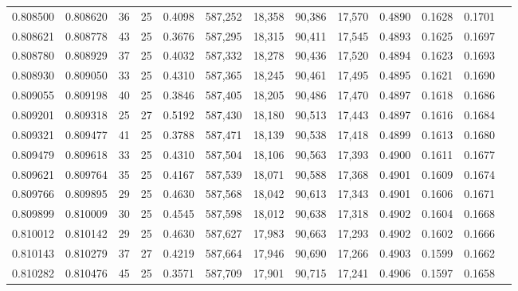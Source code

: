 \begin{tabular}{rrrrrrrrrrrrr}
0.808500 & 0.808620 &    36 &  25 &                                     0.4098 & 587,252 &  18,358 &  90,386 &  17,570 & 0.4890 & 0.1628 & 0.1701 \\
0.808621 & 0.808778 &    43 &  25 &                                     0.3676 & 587,295 &  18,315 &  90,411 &  17,545 & 0.4893 & 0.1625 & 0.1697 \\
0.808780 & 0.808929 &    37 &  25 &                                     0.4032 & 587,332 &  18,278 &  90,436 &  17,520 & 0.4894 & 0.1623 & 0.1693 \\
0.808930 & 0.809050 &    33 &  25 &                                     0.4310 & 587,365 &  18,245 &  90,461 &  17,495 & 0.4895 & 0.1621 & 0.1690 \\
0.809055 & 0.809198 &    40 &  25 &                                     0.3846 & 587,405 &  18,205 &  90,486 &  17,470 & 0.4897 & 0.1618 & 0.1686 \\
0.809201 & 0.809318 &    25 &  27 &                                     0.5192 & 587,430 &  18,180 &  90,513 &  17,443 & 0.4897 & 0.1616 & 0.1684 \\
0.809321 & 0.809477 &    41 &  25 &                                     0.3788 & 587,471 &  18,139 &  90,538 &  17,418 & 0.4899 & 0.1613 & 0.1680 \\
0.809479 & 0.809618 &    33 &  25 &                                     0.4310 & 587,504 &  18,106 &  90,563 &  17,393 & 0.4900 & 0.1611 & 0.1677 \\
0.809621 & 0.809764 &    35 &  25 &                                     0.4167 & 587,539 &  18,071 &  90,588 &  17,368 & 0.4901 & 0.1609 & 0.1674 \\
0.809766 & 0.809895 &    29 &  25 &                                     0.4630 & 587,568 &  18,042 &  90,613 &  17,343 & 0.4901 & 0.1606 & 0.1671 \\
0.809899 & 0.810009 &    30 &  25 &                                     0.4545 & 587,598 &  18,012 &  90,638 &  17,318 & 0.4902 & 0.1604 & 0.1668 \\
0.810012 & 0.810142 &    29 &  25 &                                     0.4630 & 587,627 &  17,983 &  90,663 &  17,293 & 0.4902 & 0.1602 & 0.1666 \\
0.810143 & 0.810279 &    37 &  27 &                                     0.4219 & 587,664 &  17,946 &  90,690 &  17,266 & 0.4903 & 0.1599 & 0.1662 \\
0.810282 & 0.810476 &    45 &  25 &                                     0.3571 & 587,709 &  17,901 &  90,715 &  17,241 & 0.4906 & 0.1597 & 0.1658 \\

\end{tabular}
